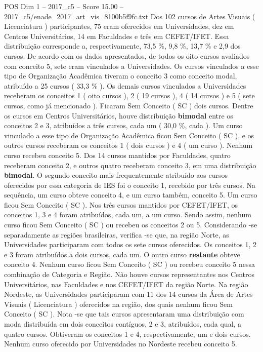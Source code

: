 \begin{textsample}{POS Dim 1 – 2017\_c5 – Score 15.00 – 2017\_c5/enade\_2017\_art\_vis\_8100b5f9fc.txt}
Dos 102 cursos de Artes Visuais ( Licenciatura ) participantes, 75 eram oferecidos em Universidades, dez em Centros Universitários, 14 em Faculdades e três em CEFET/IFET.
Essa distribuição corresponde a, respectivamente, 73,5 \%, 9,8 \%, 13,7 \% e 2,9 dos cursos.
De acordo com os dados apresentados, de todos os oito cursos avaliados com conceito 5, sete eram vinculados a Universidades.
Os cursos vinculados a esse tipo de Organização Acadêmica tiveram o conceito 3 como conceito modal, atribuído a 25 cursos ( 33,3 \% ).
Os demais cursos vinculados a Universidades receberam os conceitos 1 ( oito cursos ), 2 ( 19 cursos ), 4 ( 14 cursos ) e 5 ( sete cursos, como já mencionado ).
Ficaram Sem Conceito ( SC ) dois cursos.
Dentre os cursos em Centros Universitários, houve distribuição \textbf{bimodal} entre os conceitos 2 e 3, atribuídos a três cursos, cada um ( 30,0 \%, cada ).
Um curso vinculado a esse tipo de Organização Acadêmica ficou Sem Conceito ( SC ), e os outros cursos receberam os conceitos 1 ( dois cursos ) e 4 ( um curso ).
Nenhum curso recebeu conceito 5.
Dos 14 cursos mantidos por Faculdades, quatro receberam conceito 2, e outros quatro receberam conceito 3, em uma distribuição \textbf{bimodal}.
O segundo conceito mais frequentemente atribuído aos cursos oferecidos por essa categoria de IES foi o conceito 1, recebido por três cursos.
Na sequência, um curso obteve conceito 4, e um curso também, conceito 5.
Um curso ficou Sem Conceito ( SC ).
Nos três cursos mantidos por CEFET/IFET, os conceitos 1, 3 e 4 foram atribuídos, cada um, a um curso.
Sendo assim, nenhum curso ficou Sem Conceito ( SC ) ou recebeu os conceitos 2 ou 5.
Considerando -se separadamente as regiões brasileiras, verifica -se que, na região Norte, as Universidades participaram com todos os sete cursos oferecidos.
Os conceitos 1, 2 e 3 foram atribuídos a dois cursos, cada um.
O outro curso \textbf{restante} obteve conceito 4.
Nenhum curso ficou Sem Conceito ( SC ) ou recebeu conceito 5 nessa combinação de Categoria e Região.
Não houve cursos representantes nos Centros Universitários, nas Faculdades e nos CEFET/IFET da região Norte.
Na região Nordeste, as Universidades participaram com 11 dos 14 cursos da Área de Artes Visuais ( Licenciatura ) oferecidos na região, dos quais nenhum ficou Sem Conceito ( SC ).
Nota -se que tais cursos apresentaram uma distribuição com moda distribuída em dois conceitos contíguos, 2 e 3, atribuídos, cada qual, a quatro cursos.
Obtiveram os conceitos 1 e 4, respectivamente, um e dois cursos.
Nenhum curso oferecido por Universidades no Nordeste recebeu conceito 5.

\end{textsample}
